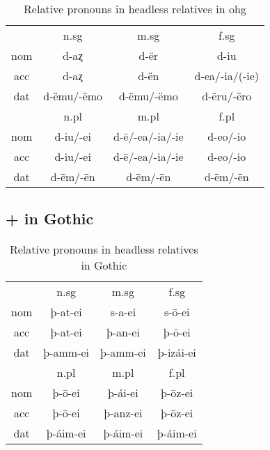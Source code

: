 \begin{table}[h]\label{tbl:paradigmohg}
	\center
	\caption {Relative pronouns in headless relatives in \ac{ohg}}
		\begin{tabular}{cccc}
		\toprule
							& \ac{n}.\ac{sg}	& \ac{m}.\ac{sg}  & \ac{f}.\ac{sg}	\\
								\cmidrule{2-4}
		\ac{nom}	& d-aȥ          	& d-ër       			& d-iu						\\
		\ac{acc}	& d-aȥ   					& d-ën						& d-ea/-ia/(-ie)	\\
		\ac{dat}	& d-ëmu/-ëmo	    & d-ëmu/-ëmo			& d-ëru/-ëro			\\
		\bottomrule
	    				& \ac{n}.\ac{pl}	& \ac{m}.\ac{pl}  	& \ac{f}.\ac{pl}	\\
	    					\cmidrule{2-4}
    \ac{nom} 	& d-iu/-ei   			&  d-ē/-ea/-ia/-ie	& d-eo/-io        \\
    \ac{acc} 	& d-iu/-ei   			&  d-ē/-ea/-ia/-ie	& d-eo/-io        \\
    \ac{dat} 	& d-ēm/-ēn   			&  d-ēm/-ēn       	& d-ēm/-ēn        \\
    \bottomrule
		\end{tabular}
\end{table}


\subsection{ +  in Gothic}


\begin{table}[h]
	\center
	\caption {Relative pronouns in headless relatives in Gothic}
		\begin{tabular}{cccc}
		\toprule
							& \ac{n}.\ac{sg} 	& \ac{m}.\ac{sg}	& \ac{f}.\ac{sg}  \\
		 						\cmidrule{2-4}
    \ac{nom} 	& þ-at-ei 	 			& s-a-ei 					& s-ō-ei					\\
    \ac{acc}	& þ-at-ei    			& þ-an-ei  				& þ-ō-ei  				\\
    \ac{dat} 	& þ-amm-ei 				& þ-amm-ei				& þ-izái-ei 			\\
		\bottomrule
    					& \ac{n}.\ac{pl}	& \ac{m}.\ac{pl}	& \ac{f}.\ac{pl}	\\
						    \cmidrule{2-4}
    \ac{nom} 	& þ-ō-ei					&	þ-ái-ei					&	þ-ōz-ei					\\
    \ac{acc} 	& þ-ō-ei 					&	þ-anz-ei				&	þ-ōz-ei					\\
    \ac{dat} 	& þ-áim-ei				&	þ-áim-ei 				&	þ-áim-ei 				\\
    \bottomrule
		\end{tabular}
\end{table}


